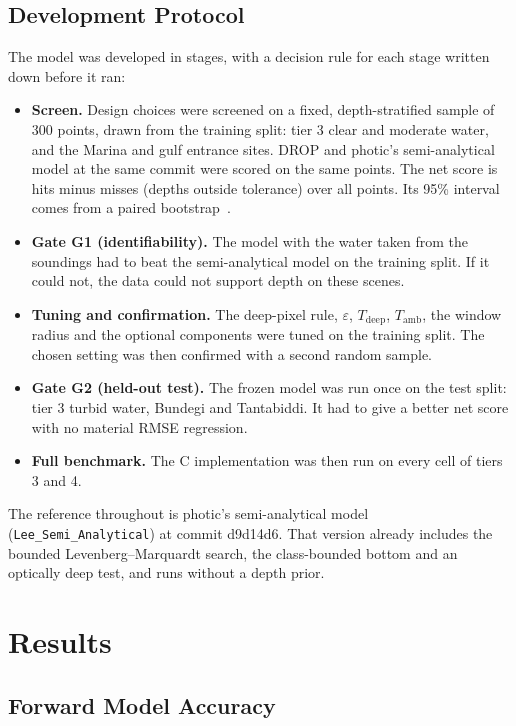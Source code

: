 \documentclass[remotesensing,article,submit,pdftex]{Definitions/mdpi}
\begin{document}
\subsection{Development Protocol}\label{sec:design}

The model was developed in stages, with a decision rule for each stage written down before it ran:
\begin{itemize}
\item \textbf{Screen.} Design choices were screened on a fixed, depth-stratified sample of 300 points, drawn from the training split: tier 3 clear and moderate water, and the Marina and gulf entrance sites. DROP and photic's semi-analytical model at the same commit were scored on the same points. The net score is hits minus misses (depths outside tolerance) over all points. Its 95\% interval comes from a paired bootstrap~\cite{efron1993}.
\item \textbf{Gate G1 (identifiability).} The model with the water taken from the soundings had to beat the semi-analytical model on the training split. If it could not, the data could not support depth on these scenes.
\item \textbf{Tuning and confirmation.} The deep-pixel rule, $\varepsilon$, $T_\mathrm{deep}$, $T_\mathrm{amb}$, the window radius and the optional components were tuned on the training split. The chosen setting was then confirmed with a second random sample.
\item \textbf{Gate G2 (held-out test).} The frozen model was run once on the test split: tier 3 turbid water, Bundegi and Tantabiddi. It had to give a better net score with no material RMSE regression.
\item \textbf{Full benchmark.} The C implementation was then run on every cell of tiers 3 and 4.
\end{itemize}
The reference throughout is photic's semi-analytical model (\texttt{Lee\_Semi\_Analytical}) at commit d9d14d6. That version already includes the bounded Levenberg--Marquardt search, the class-bounded bottom and an optically deep test, and runs without a depth prior.

\section{Results}\label{sec:results}

\subsection{Forward Model Accuracy}\label{sec:t2}
\end{document}
